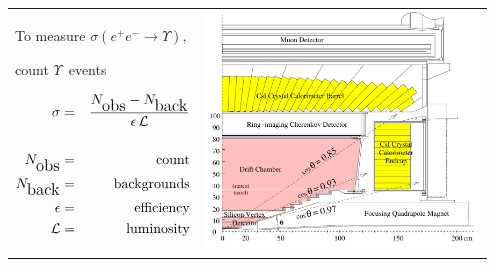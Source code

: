 \documentclass[landscape]{article}
\newcommand{\subs}[1]{{\mbox{\large #1}}}
\newcommand{\ups}{$\Upsilon$}
\begin{document}
\begin{slide:technique}

\begin{center}
\begin{tabular}{p{0.3\linewidth} p{0.65\linewidth}}
\begin{minipage}{1.01\linewidth}

To measure $\sigma(e^+e^- \to \Upsilon)$,
\begin{center}
count \ups\ events
\end{center}

\begin{eqnarray*}
\sigma &=& \frac{N_\subs{obs} - N_\subs{back}}{\epsilon \, {\mathcal L}} \\
& & \\
N_\subs{obs} &=& \mbox{count} \\
N_\subs{back} &=& \mbox{backgrounds} \\
\epsilon &=& \mbox{efficiency} \\
{\mathcal L} &=& \mbox{luminosity}
\end{eqnarray*}

\end{minipage} &
\begin{minipage}{\linewidth}
\includegraphics[width=\linewidth]{plots/quarterview}
\end{minipage}
\end{tabular}
\end{center}

\end{slide:technique}
\end{document}
